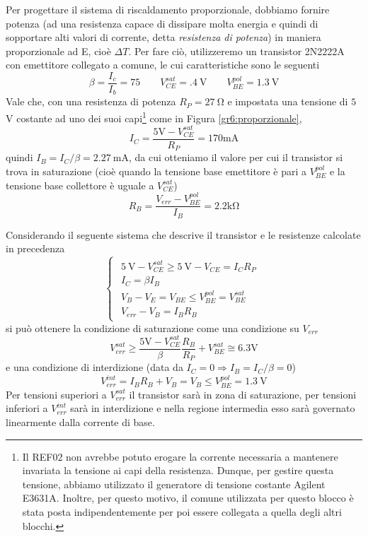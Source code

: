 Per progettare il sistema di riscaldamento proporzionale, dobbiamo fornire potenza (ad una resistenza capace di dissipare molta energia e quindi di sopportare alti valori di corrente, detta \textit{resistenza di potenza}) in maniera proporzionale ad E, cioè $\Delta T$.
Per fare ciò, utilizzeremo un transistor 2N2222A con emettitore collegato a comune, le cui caratteristiche sono le seguenti
$$\beta=\frac{I_c}{I_b}=75 \qquad V_{CE}^{sat}=\SI{.4}{\volt} \qquad V_{BE}^{pol}=\SI{1.3}{\volt}$$
Vale che, con una resistenza di potenza $R_{P} = \SI{27}{\ohm}$ e impostata una tensione di $5$ \si{\volt} costante ad uno dei suoi capi\footnote{Il REF02 non avrebbe potuto erogare la corrente necessaria a mantenere invariata la tensione ai capi della resistenza.
Dunque, per gestire questa tensione, abbiamo utilizzato il generatore di tensione costante Agilent E3631A.
Inoltre, per questo motivo, il comune utilizzata per questo blocco è stata posta indipendentemente per poi essere collegata a quella degli altri blocchi.} come in Figura \ref{gr6:proporzionale},
$$I_{C}=\frac{5 \si{\volt}- V_{CE}^{sat}}{R_P}=170 \si{\milli\ampere}$$
quindi $I_B=I_{C}/\beta=\SI{2.27}{\mA}$, da cui otteniamo il valore per cui il transistor si trova in saturazione (cioè quando la tensione base emettitore è pari a $V_{BE}^{pol}$ e la tensione base collettore è uguale a $V_{CE}^{sat}$)
$$R_B=\frac{V_{err} - V_{BE}^{pol}}{I_B}=2.2 \si{\kilo\ohm}$$

Considerando il seguente sistema che descrive il transistor e le resistenze calcolate in precedenza
$$
\begin{cases}
\begin{array}{rl}
\SI{5}{\volt}-V_{CE}^{sat} \geq \SI{5}{\volt}-V_{CE} = I_{C}R_P\\
I_C=\beta I_B \\
V_B - V_E = V_{BE} \leq V_{BE}^{pol} = V_{BE}^{sat}\\
V_{err}-V_B=I_B R_B
\end{array}
\end{cases}
$$
si può ottenere la condizione di saturazione come una condizione su $V_{err}$
\begin{equation}
V_{err}^{sat} \geq \frac{5\si{\volt}-V_{CE}^{sat}}{\beta} \frac{R_B}{R_P}+V_{BE}^{sat} \cong 6.3 \si{\volt}
\label{eq6:saturazione}
\end{equation}
e una condizione di interdizione (data da $I_C = 0 \Rightarrow I_B = I_C / \beta = 0$)
\begin{equation}
V_{err}^{int} = I_B R_B + V_B = V_B \leq V_{BE}^{pol} = \SI{1.3}{\V}
\label{eq6:interdizione}
\end{equation}
Per tensioni superiori a $V_{err}^{sat}$ il transistor sarà in zona di saturazione, per tensioni inferiori a $V_{err}^{int}$ sarà in interdizione e nella regione intermedia esso sarà governato linearmente dalla corrente di base.

